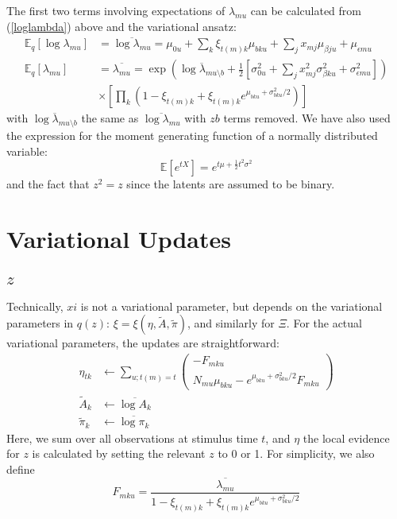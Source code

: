 \documentclass[11pt]{article}
\begin{document}
The first two terms involving expectations of $\lambda_{mu}$ can be calculated from (\ref{loglambda}) above and the variational ansatz:
\begin{align}
    \mathbb{E}_q [\log \lambda_{mu}] &= \overline{\log \lambda_{mu}} 
    = \mu_{0u} + \sum_{k} \xi_{t(m) k} \mu_{bku} + \sum_j x_{mj} \mu_{\beta j u} + \mu_{\epsilon m u} \\
    \mathbb{E}_q [\lambda_{mu}] &= \overline{\lambda_{mu}} = \exp \left( 
    \overline{\log \lambda_{mu \setminus b}}
    + \frac{1}{2} \left[ \sigma^2_{0u} 
    + \sum_j x^2_{m j} \sigma^2_{\beta ku} + \sigma^2_{\epsilon m u}
    \right]
    \right) \\ \nonumber
    &\times \left[
    \prod_k \left(
    1 - \xi_{t(m) k} + \xi_{t(m) k} e^{\mu_{bku} + \sigma^2_{bku} / 2}
    \right)\right]
\end{align}
with $\overline{\log \lambda_{mu \setminus b}}$ the same as $\overline{\log \lambda_{mu}}$ with $zb$ terms removed. We have also used the expression for the moment generating function of a normally distributed variable:
\begin{equation}
    \mathbb{E}[e^{tX}] = e^{t\mu + \frac{1}{2} t^2\sigma^2}
\end{equation}
and the fact that $z^2 = z$ since the latents are assumed to be binary.

\section{Variational Updates}

\subsection{$z$}
Technically, $xi$ is not a variational parameter, but depends on the variational parameters in $q(z)$: $\xi = \xi(\eta, \tilde{A}, \tilde{\pi})$, and similarly for $\Xi$. For the actual variational parameters, the updates are straightforward:
\begin{align}
    \eta_{tk} &\leftarrow \sum_{u; t(m) = t} 
    \begin{pmatrix}
        - F_{mku} \\
        N_{mu} \mu_{bku} -
        e^{\mu_{bku} + \sigma^2_{bku} / 2} F_{mku} 
    \end{pmatrix} \\
    \tilde{A}_{k} &\leftarrow \overline{\log A_k} \\
    \tilde{\pi}_k &\leftarrow \overline{\log \pi_k}
\end{align}
Here, we sum over all observations at stimulus time $t$, and $\eta$ the local evidence for $z$ is calculated by setting the relevant $z$ to 0 or 1. For simplicity, we also define
\begin{equation}
    F_{mku} = \frac{\overline{\lambda_{mu}}}{1 - \xi_{t(m) k} + \xi_{t(m) k} e^{\mu_{bku} + \sigma^2_{bku} / 2}}
\end{equation}
\end{document}
